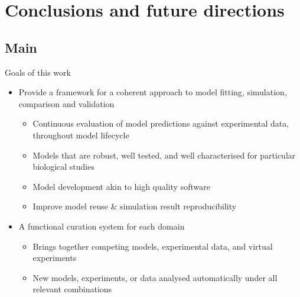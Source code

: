 \documentclass[t,xcolor={usenames,dvipsnames}]{beamer}
\begin{document}
\section{Conclusions and future directions}
\subsection*{Main}

\begin{frame}{Goals of this work}
\begin{itemize}
\item Provide a framework for a coherent approach to model fitting, simulation, comparison and validation
  \begin{itemize}
  \item Continuous evaluation of model predictions against experimental data, throughout model lifecycle
  \item Models that are robust, well tested, and well characterised for particular biological studies
  \item Model development akin to high quality software
  \item Improve model reuse \& simulation result reproducibility
  \end{itemize}
\item A functional curation system for each domain
  \begin{itemize}
  \item Brings together competing models, experimental data, and virtual experiments
  \item New models, experiments, or data analysed automatically under all relevant combinations
  \end{itemize}
\end{itemize}
\end{frame}
\end{document}
